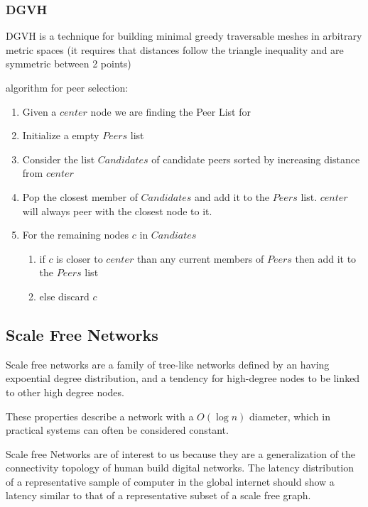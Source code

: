 \subsubsection{DGVH}

DGVH\cite{dgvh} is a technique for building minimal greedy traversable meshes in arbitrary metric spaces (it requires that distances follow the triangle inequality and are symmetric between 2 points)

algorithm for peer selection:
\begin{enumerate}
	\item Given a $center$ node we are finding the Peer List for
	\item Initialize a empty $Peers$ list
	\item Consider the list $Candidates$ of candidate peers sorted by increasing distance from $center$
	\item Pop the closest member of $Candidates$ and add it to the $Peers$ list. $center$ will always peer with the closest node to it.
	\item For the remaining nodes $c$ in $Candiates$
	\begin{enumerate}
		\item if $c$ is closer to $center$ than any current members of $Peers$ then add it to the $Peers$ list
		\item else discard $c$
	\end{enumerate}
\end{enumerate}





\subsection{Scale Free Networks}

Scale free networks are a family of tree-like networks defined by an having expoential  degree distribution, and a tendency for high-degree nodes to be linked to other high degree nodes.

These properties describe a network with a $O(\log{n})$ diameter, which in practical systems can often be considered constant.

Scale free Networks are of interest to us because they are a generalization of the connectivity topology of human build digital networks.
The latency distribution of a representative sample of computer in the global internet should show a latency similar to that of a representative subset of a scale free graph.


